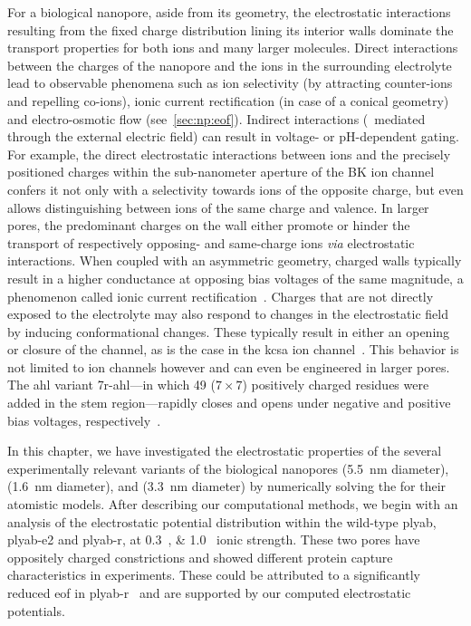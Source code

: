 For a biological nanopore, aside from its geometry, the electrostatic interactions resulting from the fixed
charge distribution lining its interior walls dominate the transport properties for both ions and many larger
molecules. Direct interactions between the charges of the nanopore and the ions in the surrounding electrolyte
lead to observable phenomena such as ion selectivity (by attracting counter-ions and repelling co-ions),
ionic current rectification (in case of a conical geometry) and electro-osmotic flow (see~\cref{sec:np:eof}).
Indirect interactions (\ie~mediated through the external electric field) can result in voltage- or
pH-dependent gating. For example, the direct electrostatic interactions between ions and the precisely
positioned charges within the sub-nanometer aperture of the BK ion channel confers it not only with a
selectivity towards ions of the opposite charge, but even allows distinguishing between ions of the same
charge and valence. In larger pores, the predominant charges on the wall either promote or hinder the
transport of respectively opposing- and same-charge ions \textit{via} electrostatic interactions. When coupled
with an asymmetric geometry, charged walls typically result in a higher conductance at opposing bias voltages
of the same magnitude, a phenomenon called ionic current
rectification~\cite{White-2008,Lin-2015,Hsu-2017b,Valisko-2019}. Charges that are not directly exposed to the
electrolyte may also respond to changes in the electrostatic field by inducing conformational changes. These
typically result in either an opening or closure of the channel, as is the case in the \gls{kcsa} ion
channel~\cite{Kopec-2019}. This behavior is not limited to ion channels however and can even be engineered in
larger pores. The \gls{ahl} variant \gls{7r-ahl}---in which 49 ($7\times7$) positively charged residues were
added in the stem region---rapidly closes and opens under negative and positive bias voltages,
respectively~\cite{Maglia-2009}.

In this chapter, we have investigated the electrostatic properties of the several experimentally relevant
variants of the biological nanopores  (\SI{5.5}{\nm} diameter),  (\SI{1.6}{\nm}
diameter), and  (\SI{3.3}{\nm} diameter) by numerically solving the  for their
atomistic models. After describing our computational methods, we begin with an analysis of the electrostatic
potential distribution within the wild-type \gls{plyab}, \gls{plyab-e2} and \gls{plyab-r}, at
\SIlist{0.3;1.0}{\Molar} ionic strength. These two pores have oppositely charged constrictions and showed
different protein capture characteristics in experiments. These could be attributed to a significantly reduced
\gls{eof} in \gls{plyab-r}~\cite{Huang-2020} and are supported by our computed electrostatic potentials.

